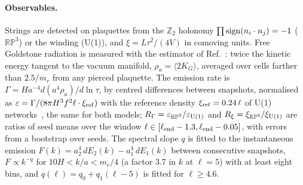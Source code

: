 \documentclass[prd,twocolumn,superscriptaddress,nofootinbib,amsmath,amssymb]{revtex4-2}
\newcommand{\RP}{\mathbb{RP}^3}
\newcommand{\Ztwo}{\mathbb{Z}_2}
\newcommand{\RG}{R_\Gamma}
\newcommand{\Rxi}{R_\xi}
\begin{document}
\paragraph{Observables.}
Strings are detected on plaquettes from the $\Ztwo$ holonomy $\prod{\rm sign}(n_i\cdot n_j)=-1$ ($\RP$) or the winding (U(1)), and $\xi=L\tau^2/(4V)$ in comoving units.
Free Goldstone radiation is measured with the estimator of Ref.~\cite{GHV2018}: twice the kinetic energy tangent to the vacuum manifold, $\rho_a=\langle2K_G\rangle$, averaged over cells farther than $2.5/m_r$ from any pierced plaquette.
The emission rate is $\Gamma=Ha^{-4}d(a^4\rho_a)/d\ln\tau$, by centred differences between snapshots, normalised as $\varepsilon=\Gamma/(8\pi H^3f^2\ell\cdot\xi_{\rm ref})$ with the reference density $\xi_{\rm ref}=0.24\,\ell$ of U(1) networks~\cite{GHV2021}, the same for both models; $\RG=\varepsilon_{\RP}/\varepsilon_{\rm U(1)}$ and $\Rxi=\xi_{\RP}/\xi_{\rm U(1)}$ are ratios of seed means over the window $\ell\in[\ell_{\rm end}-1.3,\ell_{\rm end}-0.05]$, with errors from a bootstrap over seeds.
The spectral slope $q$ is fitted to the instantaneous emission $F(k)=a_2^4\,dE_2(k)-a_1^4\,dE_1(k)$ between consecutive snapshots, $F\propto k^{-q}$ for $10H<k/a<m_r/4$ (a factor $3.7$ in $k$ at $\ell=5$) with at least eight bins, and $q(\ell)=q_0+q_1(\ell-5)$ is fitted for $\ell\ge4.6$.
\end{document}
